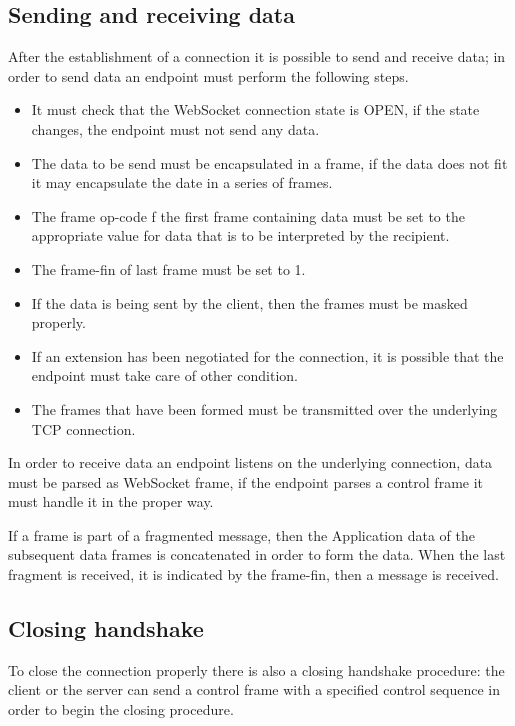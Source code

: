 \subsection{Sending and receiving data}
After the establishment of a connection it is possible to send and receive data; in order to send data an endpoint must perform the following steps.
\begin{itemize}
	\item It must check that the WebSocket connection state is OPEN, if the state changes, the endpoint must not send any data.
	\item The data to be send must be encapsulated in a frame, if the data does not fit it may encapsulate the date in a series of frames.
	\item The frame op-code f the first frame containing data must be set to the appropriate value for data that is to be interpreted by the recipient.
	\item The frame-fin of last frame must be set to 1.
	\item If the data is being sent by the client, then the frames must be masked properly.
	\item If an extension has been negotiated for the connection, it is possible that the endpoint must take care of other condition.
	\item The frames that have been formed must be transmitted over the underlying TCP connection.
\end{itemize}

In order to receive data an endpoint listens on the underlying connection, data must be parsed as WebSocket frame,
if the endpoint parses a control frame it must handle it in the proper way.\newline

If a frame is part of a fragmented message, then the Application data of the subsequent data frames is concatenated in order to form the data.\newline
When the last fragment is received, it is indicated by the frame-fin, then a message is received.\newline

\subsection{Closing handshake}
To close the connection properly there is also a closing handshake procedure: the client or
the server can send a control frame with a specified control sequence in order to begin the closing procedure.\newline

